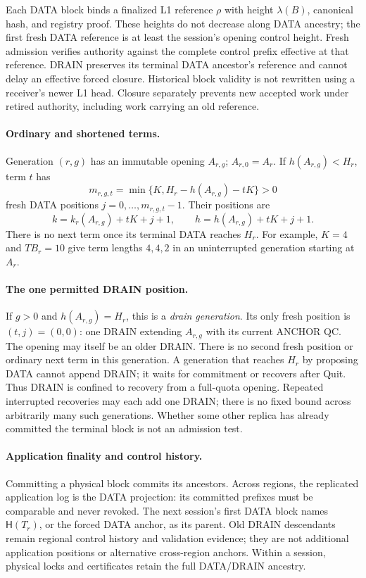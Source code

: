 \documentclass[11pt,a4paper]{article}
\newcommand{\Hash}{\mathsf H}
\begin{document}
Each DATA block binds a finalized L1 reference $\rho$ with height
$\lambda(B)$, canonical hash, and registry proof. These heights do not
decrease along DATA ancestry; the first fresh DATA reference is at least
the session's opening control height. Fresh admission verifies authority
against the complete control prefix effective at that reference.
DRAIN preserves its terminal DATA ancestor's reference and cannot delay
an effective forced closure. Historical block validity is not rewritten
using a receiver's newer L1 head. Closure separately prevents new accepted
work under retired authority, including work carrying an old reference.

\paragraph{Ordinary and shortened terms.}
Generation $(r,g)$ has an immutable opening $A_{r,g}$; $A_{r,0}=A_r$.
If $h(A_{r,g})<H_r$, term $t$ has
\[
 m_{r,g,t}=\min\{K,H_r-h(A_{r,g})-tK\}>0
\]
fresh DATA positions $j=0,\ldots,m_{r,g,t}-1$. Their positions are
\[
 k=k_r(A_{r,g})+tK+j+1,\qquad
 h=h(A_{r,g})+tK+j+1.
\]
There is no next term once its terminal DATA reaches $H_r$.
For example, $K=4$ and $TB_r=10$ give term lengths $4,4,2$ in an
uninterrupted generation starting at $A_r$.

\paragraph{The one permitted DRAIN position.}
\label{sec:drain}
If $g>0$ and $h(A_{r,g})=H_r$, this is a \emph{drain generation}.
Its only fresh position is $(t,j)=(0,0)$: one DRAIN extending $A_{r,g}$
with its current ANCHOR QC. The opening may itself be an older DRAIN.
There is no second fresh position or ordinary next term in this generation.
A generation that reaches $H_r$ by proposing DATA cannot append DRAIN;
it waits for commitment or recovers after Quit. Thus DRAIN is confined
to recovery from a full-quota opening. Repeated interrupted recoveries may
each add one DRAIN; there is no fixed bound across arbitrarily many such
generations. Whether some other replica has already committed the terminal
block is not an admission test.

\paragraph{Application finality and control history.}
Committing a physical block commits its ancestors. Across regions, the
replicated application log is the DATA projection: its committed prefixes
must be comparable and never revoked. The next session's first DATA block
names $\Hash(T_r)$, or the forced DATA anchor, as its parent. Old DRAIN
descendants remain regional control history and validation evidence; they
are not additional application positions or alternative cross-region
anchors. Within a session, physical locks and certificates retain the full
DATA/DRAIN ancestry.
\end{document}
